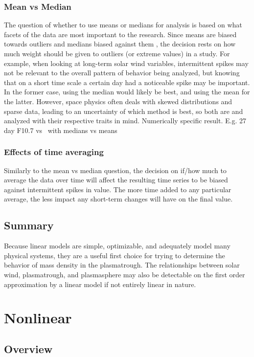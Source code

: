 \subsubsection{Mean vs Median}
The question of whether to use means or medians for analysis is based on what facets of the data are most important to the research. Since means are biased towards outliers and medians biased against them , the decision rests on how much weight should be given to outliers (or extreme values) in a study. For example, when looking at long-term solar wind variables, intermittent spikes may not be relevant to the overall pattern of behavior being analyzed, but knowing that on a short time scale a certain day had a noticeable spike may be important. In the former case, using the median would likely be best, and using the mean for the latter. However, space physics often deals with skewed distributions and sparse data, leading to an uncertainty of which method is best, so both are and analyzed with their respective traits in mind.
\note Numerically specific result. E.g. 27 day F10.7 vs \req\ with medians vs means

\subsubsection{Effects of time averaging}
Similarly to the mean vs median question, the decision on if/how much to average the data over time will affect the resulting time series to be biased against intermittent spikes in value. The more time added to any particular average, the less impact any short-term changes will have on the final value.

\subsection{Summary}
Because linear models are simple, optimizable, and adequately model many physical systems, they are a useful first choice for trying to determine the behavior of mass density in the plasmatrough. The relationships between solar wind, plasmatrough, and plasmasphere may also be detectable on the first order approximation by a linear model if not entirely linear in nature.


\section{Nonlinear}

\subsection{Overview}


